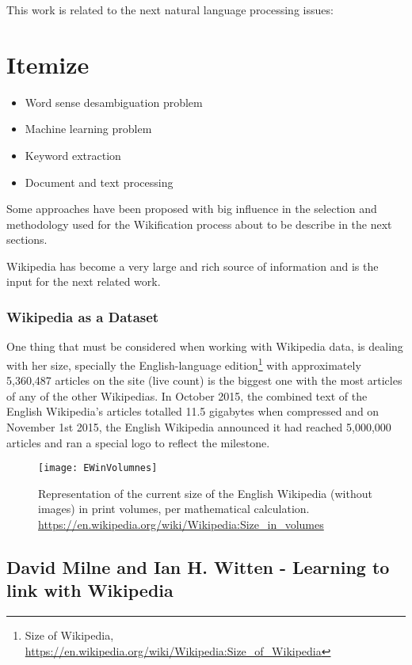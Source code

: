 This work is related to the next natural language processing issues:

\section*{Itemize}
\begin{itemize}
\item Word sense desambiguation problem
\item Machine learning problem
\item Keyword extraction
\item Document and text processing
\end{itemize}

Some approaches have been proposed with big influence in the selection and methodology used for the Wikification process
about to be describe in the next sections.

Wikipedia has become a very large and rich source of information and is the input for the next related work.

\subsubsection{Wikipedia as a Dataset}
One thing that must be considered when working with Wikipedia data, is dealing with her size, specially the English-language 
edition\footnote{Size of Wikipedia, \url{https://en.wikipedia.org/wiki/Wikipedia:Size_of_Wikipedia}} 
with approximately 5,360,487 articles on the site (live count) is the biggest one with the most articles of any of the other Wikipedias.
In October 2015, the combined text of the English Wikipedia's articles totalled 11.5 gigabytes when compressed and  on November 1st 2015, 
the English Wikipedia announced it had reached 5,000,000 articles and ran a special logo to reflect the milestone.

\begin{figure}[htbp!] 
\centering    
\texttt{[image: EWinVolumnes]}
\caption[EWinVolumnes]{Representation of the current size of the English Wikipedia (without images) in print volumes, per mathematical calculation. \url{https://en.wikipedia.org/wiki/Wikipedia:Size_in_volumes}}
\label{fig:EWinVolumnes}
\end{figure}
\subsection{David Milne and Ian H. Witten - Learning to link with Wikipedia}

